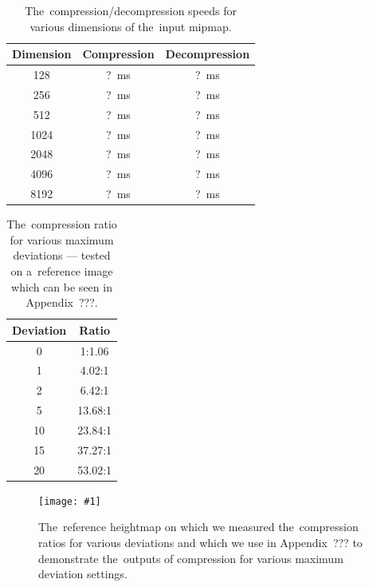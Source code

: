 \begin{table}
	\begin{center}
	\begin{tabular}{ | c | c | c | }
		\hline
		Dimension & Compression & Decompression \\ \hline
		128 & ?~ms & ?~ms  \\ \hline
		256 & ?~ms & ?~ms  \\ \hline
		512 & ?~ms & ?~ms  \\ \hline
		1024 & ?~ms & ?~ms \\ \hline
		2048 & ?~ms & ?~ms \\ \hline
		4096 & ?~ms & ?~ms \\ \hline
		8192 & ?~ms & ?~ms \\ \hline
	\end{tabular}
	\caption{The~compression/decompression speeds for various dimensions of the~input mipmap.}
	\label{tab:speeds}
\end{center}
\end{table}

\begin{table}
	\begin{center}
		\begin{tabular}{ | c | c | }
			\hline
			Deviation & Ratio \\ \hline
			0 & 1:1.06  \\ \hline
			1 & 4.02:1  \\ \hline
			2 & 6.42:1  \\ \hline
			5 & 13.68:1  \\ \hline
			10 & 23.84:1 \\ \hline
			15 & 37.27:1 \\ \hline
			20 & 53.02:1 \\ \hline
		\end{tabular}
		\caption{The~compression ratio for various maximum deviations --- tested on a~reference image which can be seen in Appendix~???.}
		\label{tab:ratios}
	\end{center}
\end{table}

\newcommand{\hspaceimg}{\hspace{0.05cm}}
\newcommand{\vspaceimg}{\vspace{0.15cm}}
\newcommand{\incexamplsolo}[1]{\texttt{[image: \#1]}}

\begin{figure}
	\begin{center}
	\incexamplsolo{figures/ref_orig.png} \\ \vspaceimg
	\end{center}
	\caption{The~reference heightmap on which we measured the~compression ratios for various deviations and which we use in Appendix~??? to demonstrate the~outputs of compression for various maximum deviation settings.}
	\label{fig:ref_map}
\end{figure}

